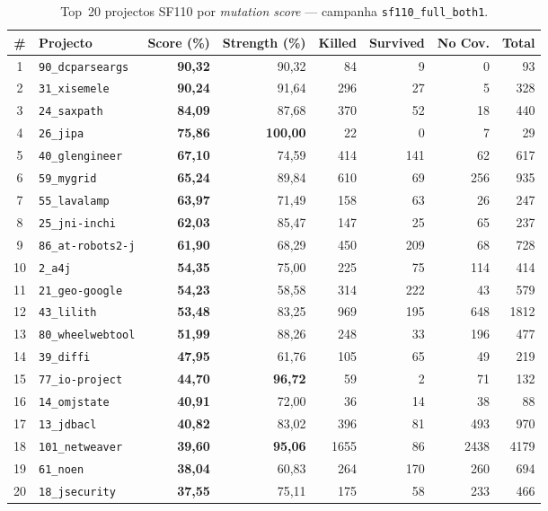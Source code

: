 \documentclass[12pt,a4paper]{article}
\begin{document}
\begin{table}[H]
  \centering
  \caption{Top~20 projectos SF110 por \textit{mutation score} --- campanha \texttt{sf110\_full\_both1}.}
  \label{tab:top20}
  \footnotesize
  \begin{tabular}{clrrrrrr}
    \toprule
    \textbf{\#} & \textbf{Projecto} & \textbf{Score (\%)} & \textbf{Strength (\%)} &
    \textbf{Killed} & \textbf{Survived} & \textbf{No Cov.} & \textbf{Total} \\
    \midrule
    1  & \texttt{90\_dcparseargs}  & \textbf{90,32} & 90,32  &  84 &   9 &   0 &   93 \\
    2  & \texttt{31\_xisemele}     & \textbf{90,24} & 91,64  & 296 &  27 &   5 &  328 \\
    3  & \texttt{24\_saxpath}      & \textbf{84,09} & 87,68  & 370 &  52 &  18 &  440 \\
    4  & \texttt{26\_jipa}         & \textbf{75,86} & \textbf{100,00} &  22 &   0 &   7 &   29 \\
    5  & \texttt{40\_glengineer}   & \textbf{67,10} & 74,59  & 414 & 141 &  62 &  617 \\
    6  & \texttt{59\_mygrid}       & \textbf{65,24} & 89,84  & 610 &  69 & 256 &  935 \\
    7  & \texttt{55\_lavalamp}     & \textbf{63,97} & 71,49  & 158 &  63 &  26 &  247 \\
    8  & \texttt{25\_jni-inchi}    & \textbf{62,03} & 85,47  & 147 &  25 &  65 &  237 \\
    9  & \texttt{86\_at-robots2-j} & \textbf{61,90} & 68,29  & 450 & 209 &  68 &  728 \\
    10 & \texttt{2\_a4j}           & \textbf{54,35} & 75,00  & 225 &  75 & 114 &  414 \\
    11 & \texttt{21\_geo-google}   & \textbf{54,23} & 58,58  & 314 & 222 &  43 &  579 \\
    12 & \texttt{43\_lilith}       & \textbf{53,48} & 83,25  & 969 & 195 & 648 & 1812 \\
    13 & \texttt{80\_wheelwebtool} & \textbf{51,99} & 88,26  & 248 &  33 & 196 &  477 \\
    14 & \texttt{39\_diffi}        & \textbf{47,95} & 61,76  & 105 &  65 &  49 &  219 \\
    15 & \texttt{77\_io-project}   & \textbf{44,70} & \textbf{96,72}  &  59 &   2 &  71 &  132 \\
    16 & \texttt{14\_omjstate}     & \textbf{40,91} & 72,00  &  36 &  14 &  38 &   88 \\
    17 & \texttt{13\_jdbacl}       & \textbf{40,82} & 83,02  & 396 &  81 & 493 &  970 \\
    18 & \texttt{101\_netweaver}   & \textbf{39,60} & \textbf{95,06}  &1655 &  86 &2438 & 4179 \\
    19 & \texttt{61\_noen}         & \textbf{38,04} & 60,83  & 264 & 170 & 260 &  694 \\
    20 & \texttt{18\_jsecurity}    & \textbf{37,55} & 75,11  & 175 &  58 & 233 &  466 \\
    \bottomrule
  \end{tabular}
\end{table}
\end{document}
